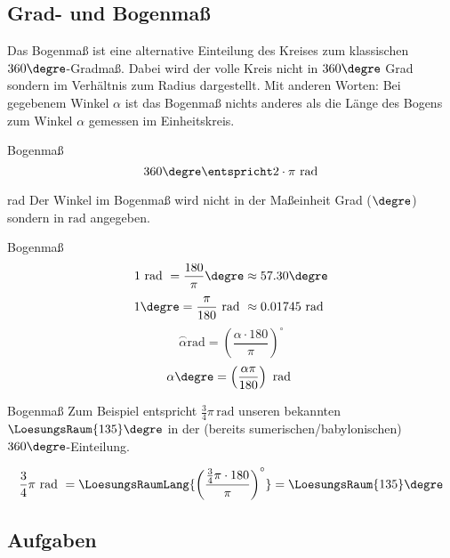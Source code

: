 
\subsection{Grad- und Bogenmaß}


Das Bogenmaß ist eine alternative Einteilung des Kreises zum
klassischen $360\degre$-Gradmaß. Dabei wird der volle Kreis nicht in
$360\degre$ Grad sondern im Verhältnis zum Radius dargestellt. Mit
anderen Worten: Bei gegebenem Winkel $\alpha$ ist das Bogenmaß nichts
anderes als die Länge des Bogens zum Winkel $\alpha$ gemessen im Einheitskreis.


\begin{definition}{Bogenmaß}{}
$$360\degre \entspricht 2\cdot\pi \text{\,\,rad}$$
\end{definition}

\begin{bemerkung}{rad}{}
Der Winkel im Bogenmaß wird nicht in der Maßeinheit Grad (${}\degre$)
sondern in $\text{rad}$ angegeben.
\end{bemerkung}

\begin{gesetz}{Bogenmaß}{}
$$1 \text{ rad } = \frac{180}{\pi}\degre \approx 57.30\degre$$
$$1\degre = \frac{\pi}{180} \text{ rad } \approx 0.01745 \text{ rad }$$
$$\stackrel{\frown}{\alpha} \text{rad} = \left(\frac{\alpha\cdot{}180}{\pi}\right)^\circ$$
$$\alpha\degre = \left(\frac{\alpha\pi}{180}\right) \text{ rad }$$  
\end{gesetz}
\newpage
\begin{beispiel}{Bogenmaß}{}
 Zum Beispiel entspricht
$\frac{3}{4}\pi\,\text{rad}$ unseren bekannten $\LoesungsRaum{135}\degre$ in der
(bereits sumerischen/babylonischen) $360\degre$-Einteilung.

 $$\frac34\pi \text{ rad } = \LoesungsRaumLang{\left(\frac{\frac34\pi\cdot{}180}{\pi}\right)^\circ} = \LoesungsRaum{135}\degre$$
\end{beispiel}



\subsection*{Aufgaben}




\newpage

